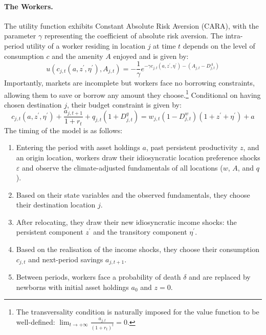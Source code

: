 \documentclass[11pt, a4paper]{article}
\begin{document}
\paragraph{The Workers.} The utility function exhibits Constant Absolute Risk Aversion (CARA), with the parameter $\gamma$ representing the coefficient of absolute risk aversion. The intra-period utility of a worker residing in location $j$ at time $t$ depends on the level of consumption $c$ and the amenity $A$ enjoyed and is given by:
\begin{equation}
u(c_{j,t}(a, z^\prime, \eta^\prime), A_{j,t}) = -\frac{1}{\gamma} e^{-\gamma c_{j,t}(a, z^\prime, \eta^\prime) - (A_{j,t} - D^A_{j,t})}
\end{equation}
Importantly, markets are incomplete but workers face no borrowing constraints, allowing them to save or borrow any amount they choose.\footnote{The transversality condition is naturally imposed for the value function to be well-defined: $\lim_{t \rightarrow +\infty}\frac{a_{j,t}}{(1 + r_t)^t} = 0$.} Conditional on having chosen destination $j$, their budget constraint is given by:
\begin{equation}
c_{j,t}(a, z^\prime, \eta^\prime) + \frac{a_{j,t+1}}{1 + r_t} + q_{j,t}(1+ D^q_{j,t}) = w_{j,t}(1-D^w_{j,t})(1 + z^\prime + \eta^\prime) + a
\label{eq:budget}
\end{equation}
The timing of the model is as follows: 
\begin{enumerate}[noitemsep, topsep=2pt]
  \item Entering the period with asset holdings $a$, past persistent productivity $z$, and an origin location, workers draw their idiosyncratic location preference shocks $\varepsilon$ and observe the climate-adjusted fundamentals of all locations ($w$, $A$, and $q$).
  \item Based on their state variables and the observed fundamentals, they choose their destination location $j$.
  \item After relocating, they draw their new idiosyncratic income shocks: the persistent component $z^\prime$ and the transitory component $\eta^\prime$.
  \item Based on the realisation of the income shocks, they choose their consumption $c_{j,t}$ and next-period savings $a_{j,t+1}$.
  \item Between periods, workers face a probability of death $\delta$ and are replaced by newborns with initial asset holdings $a_0$ and $z = 0$.
\end{enumerate}
\end{document}
